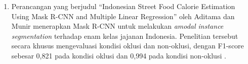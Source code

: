 \begin{enumerate}
    \item Perancangan yang berjudul ``Indonesian Street Food Calorie Estimation Using Mask R-CNN and Multiple Linear Regression'' oleh Aditama dan Munir menerapkan Mask R-CNN untuk melakukan \textit{amodal instance segmentation} terhadap enam kelas jajanan Indonesia. Penelitian tersebut secara khusus mengevaluasi kondisi oklusi dan non-oklusi, dengan F1-score sebesar 0,821 pada kondisi oklusi dan 0,994 pada kondisi non-oklusi \cite{aditama2022}.
\end{enumerate}

